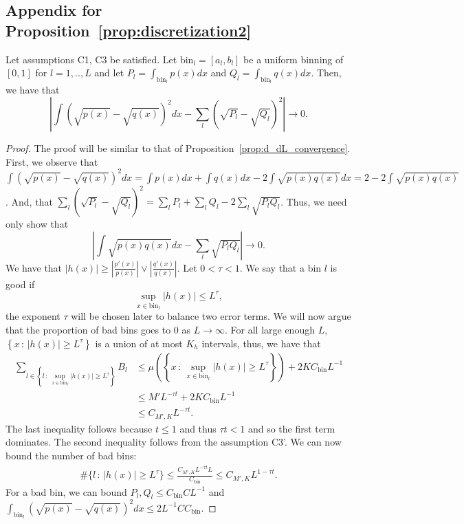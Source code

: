 \documentclass{article}
\newcommand{\bin}{\text{bin}}
\begin{document}
\subsection{Appendix for Proposition~\ref{prop:discretization2}} \label{appendix: another saturday}
\begin{proposition}
\label{prop:H_HL_convergence2}
Let assumptions C1, C3 be satisfied. Let $\bin_l = [a_l, b_l]$ be a uniform binning of $[0,1]$ for $l=1,..,L$ and let $P_l = \int_{\bin_l} p(x) dx$ and $Q_l = \int_{\bin_l} q(x) dx$. Then, we have that
\[
\left| \int (\sqrt{p(x)} - \sqrt{q(x)})^2 dx - \sum_l (\sqrt{P_l} - \sqrt{Q_l})^2 \right| \rightarrow 0.
\]
\end{proposition}



\begin{proof}
The proof will be similar to that of Proposition~\ref{prop:d_dL_convergence}.  First, we observe that $\int (\sqrt{p(x)} - \sqrt{q(x)})^2 dx = \int p(x) dx + \int q(x) dx - 2 \int \sqrt{p(x)q(x)} dx = 2 - 2 \int \sqrt{p(x)q(x)}$. And, that $\sum_l (\sqrt{P_l} - \sqrt{Q_l})^2 = \sum_l P_l + \sum_l Q_l - 2 \sum_l \sqrt{P_l Q_l}$. Thus, we need only show that 
\[
\left| \int \sqrt{p(x)q(x)} dx - \sum_l \sqrt{P_l Q_l} \right| \rightarrow 0.
\]
We have that $|h(x)| \geq \left| \frac{p'(x)}{p(x)} \right| \vee \left| \frac{q'(x)}{q(x)} \right|$. Let $0 < \tau < 1$. We say that a bin $l$ is good if
$$
\sup_{x \in \bin_l} |h(x)| \leq L^\tau,
$$
the exponent $\tau$ will be chosen later to balance two error terms. We will now argue that the proportion of bad bins goes to 0 as $L \rightarrow \infty$. For all large enough $L$, $\left \{x \,:\, |h(x)|  \geq L^\tau \right \}$ is a union of at most $K_h$ intervals, thus, we have that
\begin{align*}
\sum_{l \in \left \{ l \,:\, \sup_{x \in \bin_l} |h(x)| 
           \geq L^\tau \right \}}  B_l &\leq 
   \mu \left( \left\{x \,:\, \sup_{x \in \bin_l} |h(x)|
         \geq L^\tau \right\} \right) + 2 K C_\bin L^{-1} \\
  &\leq M' L^{-\tau t}  + 2K C_\bin L^{-1} \\
  & \leq C_{M', K} L^{ - \tau t}. 
\end{align*}
The last inequality follows because $t \leq 1$ and thus $\tau t < 1$ and so the first term dominates. The second inequality follows from the assumption C3'. We can now bound the number of bad bins: 
\begin{align*}
\# \{ l \,:\, |h(x)| \geq L^\tau \} \leq \frac{C_{M', K} L^{- \tau t} L}{C_\bin}  \leq C_{M',K} L^{1 - \tau t}.
\end{align*}
For a bad bin, we can bound $P_l, Q_l \leq C_\bin C L^{-1}$ and $\int_{\bin_l} (\sqrt{p(x)} - \sqrt{q(x)})^2 dx \leq 2 L^{-1} C C_\bin $.


\end{proof}
\end{document}
